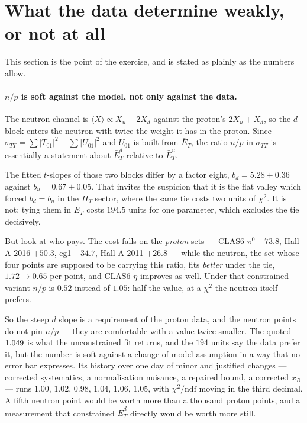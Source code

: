 \documentclass[11pt,a4paper]{article}
\newcommand{\sig}[1]{\sigma_{#1}}
\begin{document}
\section{What the data determine weakly, or not at all}
\label{sec:notmeasured}

This section is the point of the exercise, and is stated as plainly as the
numbers allow.

\paragraph{$n/p$ is soft against the model, not only against the data.}
The neutron channel is $\langle X\rangle \propto X_u + 2X_d$ against the
proton's $2X_u + X_d$, so the $d$ block enters the neutron with twice the weight
it has in the proton.  Since $\sig{TT} = \sum|T_{01}|^2 - \sum|U_{01}|^2$ and
$U_{01}$ is built from $\bar E_T$, the ratio $n/p$ in $\sig{TT}$ is essentially a
statement about $\bar E_T^d$ relative to $\bar E_T^u$.

The fitted $t$-slopes of those two blocks differ by a factor eight,
$b_d = 5.28 \pm 0.36$ against $b_u = 0.67 \pm 0.05$.  That invites the suspicion
that it is the flat valley which forced $b_d = b_u$ in the $H_T$ sector, where
the same tie costs two units of $\chi^2$.  It is not: tying them in
$\bar E_T$ costs $194.5$ units for one parameter, which excludes the tie
decisively.

But look at who pays.  The cost falls on the \emph{proton} sets --- CLAS6
$\pi^0$ $+73.8$, Hall A 2016 $+50.3$, eg1 $+34.7$, Hall A 2011 $+26.8$ --- while
the neutron, the set whose four points are supposed to be carrying this ratio,
fits \emph{better} under the tie, $1.72 \to 0.65$ per point, and CLAS6 $\eta$
improves as well.  Under that constrained variant $n/p$ is $0.52$ instead of
$1.05$: half the value, at a $\chi^2$ the neutron itself prefers.

So the steep $d$ slope is a requirement of the proton data, and the neutron
points do not pin $n/p$ --- they are comfortable with a value twice smaller.
The quoted $1.049$ is what the unconstrained fit returns, and the $194$ units
say the data prefer it, but the number is soft against a change of model
assumption in a way that no error bar expresses.  Its history over one day of
minor and justified changes --- corrected systematics, a normalisation nuisance,
a repaired bound, a corrected $x_B$ --- runs $1.00$, $1.02$, $0.98$, $1.04$,
$1.06$, $1.05$, with $\chi^2/\mathrm{ndf}$ moving in the third decimal.  A fifth
neutron point would be worth more than a thousand proton points, and a
measurement that constrained $\bar E_T^d$ directly would be worth more still.
\end{document}
